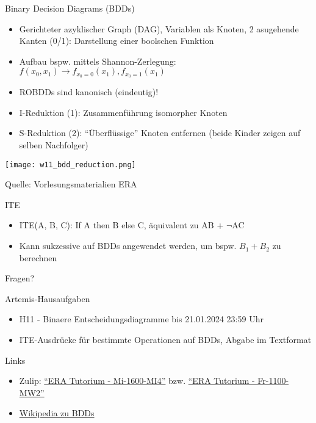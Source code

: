 \documentclass[
  german,            %
  aspectratio=169,    %
]{tumbeamer}
\begin{document}
\begin{frame}[c, fragile]{Binary Decision Diagrams (BDDs)}{}
  \begin{itemize}
    \item Gerichteter azyklischer Graph (DAG), Variablen als Knoten, 2 asugehende Kanten (0/1): Darstellung einer boolschen Funktion
    \item Aufbau bspw. mittels Shannon-Zerlegung: $f(x_0, x_1) \rightarrow f_{x_0=0}(x_1), f_{x_0=1}(x_1)$
    \item ROBDDs sind kanonisch (eindeutig)!
    \item I-Reduktion (1): Zusammenführung isomorpher Knoten
    \item S-Reduktion (2): \enquote{Überflüssige} Knoten entfernen (beide Kinder zeigen auf selben Nachfolger)
  \end{itemize}
  \begin{center}
    \texttt{[image: w11\_bdd\_reduction.png]}
  \end{center}
  \centering
  \tiny{Quelle: Vorlesungsmaterialien ERA}
\end{frame}

\begin{frame}[c, fragile]{ITE}
  \begin{itemize}
    \item ITE(A, B, C): If A then B else C, äquivalent zu AB + $\neg$AC
    \item Kann sukzessive auf BDDs angewendet werden, um bspw. $B_1 + B_2$ zu berechnen
  \end{itemize}
\end{frame}


\begin{frame}[c]{}{}
  \begin{center}
    \LARGE Fragen?
  \end{center}
\end{frame}

\begin{frame}[c, fragile]{Artemis-Hausaufgaben}{}
  \begin{itemize}
    \item H11 - Binaere Entscheidungsdiagramme bis 21.01.2024 23:59 Uhr
    \item ITE-Ausdrücke für bestimmte Operationen auf BDDs, Abgabe im Textformat
  \end{itemize}
\end{frame}

\begin{frame}[fragile, c]{Links}{}
  \begin{itemize}
    \item Zulip: \href{https://zulip.in.tum.de/#narrow/stream/1917-ERA-Tutorium---Mi-1600-MI4}{\enquote{ERA Tutorium - Mi-1600-MI4}}
    bzw. \href{https://zulip.in.tum.de/#narrow/stream/1940-ERA-Tutorium---Fr-1100-MW2}{\enquote{ERA Tutorium - Fr-1100-MW2}}
    \item \href{https://en.wikipedia.org/wiki/Binary_decision_diagram}{Wikipedia zu BDDs}
  \end{itemize}
\end{frame}

\maketitle
\end{document}
